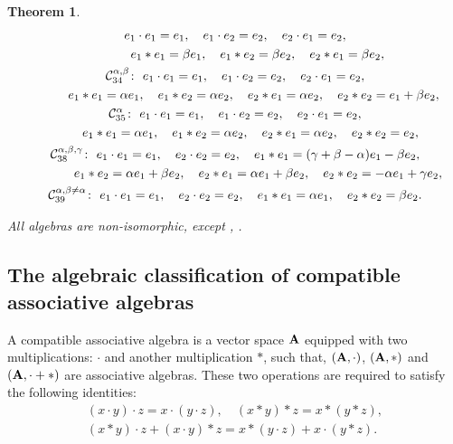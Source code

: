 \documentclass[10pt,a4paper]{amsart}
\numberwithin{equation}{section}
\newtheorem{Theorem}{Theorem}[section]
\begin{document}
\begin{Theorem}
\begin{gather*}
 e_{1}\cdot e_{1}=e_{1} , \quad e_{1}\cdot e_{2}= e_{2} , \quad e_{2}\cdot
e_{1}=e_{2} , \\
\hphantom{\mathcal{C}_{32}^{1 ,\beta ,\beta } \colon} \
 e_{1}\ast e_{1}=\beta e_{1} , \quad e_{1}\ast e_{2}=\beta e_{2} , \quad
e_{2}\ast e_{1}=\beta e_{2},
 \\
 \mathcal{C}_{34}^{\alpha ,\beta } \colon\
 e_{1}\cdot e_{1}=e_{1} , \quad e_{1}\cdot e_{2}=e_{2} , \quad e_{2}\cdot
e_{1}=e_{2} , \\
\hphantom{\mathcal{C}_{34}^{\alpha ,\beta } \colon} \
 e_{1}\ast e_{1}=\alpha e_{1} , \quad e_{1}\ast e_{2}=\alpha e_{2} , \quad
e_{2}\ast e_{1}=\alpha e_{2} , \quad e_{2}\ast e_{2}=e_{1}+\beta e_{2},
 \\
 \mathcal{C}_{35}^{\alpha } \colon\
 e_{1}\cdot e_{1}=e_{1} , \quad e_{1}\cdot e_{2}=e_{2} , \quad e_{2}\cdot
e_{1}=e_{2} , \\
\hphantom{\mathcal{C}_{35}^{\alpha } \colon} \
 e_{1}\ast e_{1}=\alpha e_{1} , \quad e_{1}\ast e_{2}=\alpha e_{2} , \quad
e_{2}\ast e_{1}=\alpha e_{2} , \quad e_{2}\ast e_{2}=e_{2},
 \\
 \mathcal{C}_{38}^{\alpha ,\beta ,\gamma } \colon\
 e_{1}\cdot e_{1}=e_{1} , \quad e_{2}\cdot e_{2}=e_{2} , \quad
 e_{1}\ast e_{1}=( \gamma +\beta -\alpha ) e_{1}-\beta e_{2} ,\\
 \hphantom{\mathcal{C}_{38}^{\alpha ,\beta ,\gamma } \colon} \
e_{1}\ast e_{2}=\alpha e_{1}+\beta e_{2} , \quad
 e_{2}\ast e_{1}=\alpha
e_{1}+\beta e_{2} , \quad e_{2}\ast e_{2}=-\alpha e_{1}+\gamma e_{2},
 \\
 \mathcal{C}_{39}^{\alpha ,\beta \neq \alpha } \colon\
 e_{1}\cdot e_{1}=e_{1} ,\quad e_{2}\cdot e_{2}=e_{2} , \quad
 e_{1}\ast e_{1}=\alpha e_{1} , \quad e_{2}\ast e_{2}=\beta e_{2}.
\end{gather*}

All algebras are non-isomorphic, except
,
.
\end{Theorem}

\subsection{The algebraic classification of compatible associative algebras}

\begin{Definition}
A compatible associative algebra is a vector space ${\bf A}$ equipped with
two multiplications: $\cdot$ and another multiplication $\ast$,
such that, $({\bf A}, \cdot)$, $({\bf A}, \ast)$ and
$({\bf A}, \cdot+ \ast)$ are associative algebras.
These two operations are required to satisfy the following identities:
\begin{gather*}
( x\cdot y) \cdot z=x\cdot ( y\cdot
z),\quad
( x\ast y) \ast z=x\ast ( y\ast z),\\
(x\ast y)\cdot z+(x\cdot y)\ast z=
x\ast (y\cdot z)+x\cdot (y\ast z).
 \end{gather*}
 \end{Definition}
\end{document}
